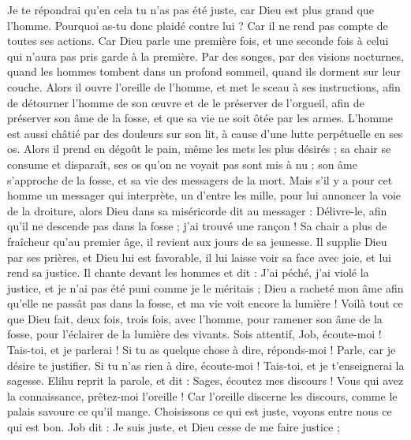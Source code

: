 \begin{multicols}{2}
Je te répondrai qu'en cela tu n'as pas été juste, car Dieu est plus grand que l'homme.
Pourquoi as-tu donc plaidé contre lui ? Car il ne rend pas compte de toutes ses actions.
Car Dieu parle une première fois, et une seconde fois à celui qui n'aura pas pris garde à la première.
Par des songes, par des visions nocturnes, quand les hommes tombent dans un profond sommeil, quand ils dorment sur leur couche.
Alors il ouvre l'oreille de l'homme, et met le sceau à ses instructions,
afin de détourner l'homme de son œuvre et de le préserver de l'orgueil,
afin de préserver son âme de la fosse, et que sa vie ne soit ôtée par les armes.
L'homme est aussi châtié par des douleurs sur son lit, à cause d'une lutte perpétuelle en ses os.
Alors il prend en dégoût le pain, même les mets les plus désirés ;
sa chair se consume et disparaît, ses os qu'on ne voyait pas sont mis à nu ;
son âme s'approche de la fosse, et sa vie des messagers de la mort.
Mais s'il y a pour cet homme un messager qui interprète, un d'entre les mille, pour lui annoncer la voie de la droiture,
alors Dieu dans sa miséricorde dit au messager : Délivre-le, afin qu'il ne descende pas dans la fosse ; j'ai trouvé une rançon !
Sa chair a plus de fraîcheur qu'au premier âge, il revient aux jours de sa jeunesse.
Il supplie Dieu par ses prières, et Dieu lui est favorable, il lui laisse voir sa face avec joie, et lui rend sa justice.
Il chante devant les hommes et dit : J'ai péché, j'ai violé la justice, et je n'ai pas été puni comme je le méritais ;
Dieu a racheté mon âme afin qu'elle ne passât pas dans la fosse, et ma vie voit encore la lumière !
Voilà tout ce que Dieu fait, deux fois, trois fois, avec l'homme,
pour ramener son âme de la fosse, pour l'éclairer de la lumière des vivants.
Sois attentif, Job, écoute-moi ! Tais-toi, et je parlerai !
Si tu as quelque chose à dire, réponds-moi ! Parle, car je désire te justifier.
Si tu n'as rien à dire, écoute-moi ! Tais-toi, et je t'enseignerai la sagesse.
\VerseOne{}Elihu reprit la parole, et dit :
Sages, écoutez mes discours ! Vous qui avez la connaissance, prêtez-moi l'oreille !
Car l'oreille discerne les discours, comme le palais savoure ce qu'il mange.
Choisissons ce qui est juste, voyons entre nous ce qui est bon.
Job dit : Je suis juste, et Dieu cesse de me faire justice ;

\end{multicols}
